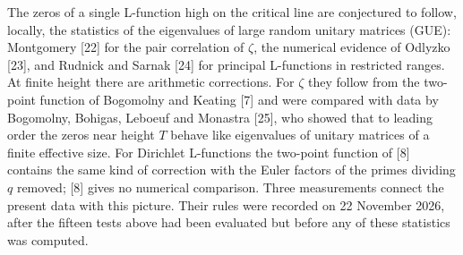\documentclass[
  10pt,
]{article}
\begin{document}
The zeros of a single L-function high on the critical line are
conjectured to follow, locally, the statistics of the eigenvalues of
large random unitary matrices (GUE): Montgomery {[}22{]} for the pair
correlation of \(\zeta\), the numerical evidence of Odlyzko {[}23{]},
and Rudnick and Sarnak {[}24{]} for principal L-functions in restricted
ranges. At finite height there are arithmetic corrections. For \(\zeta\)
they follow from the two-point function of Bogomolny and Keating {[}7{]}
and were compared with data by Bogomolny, Bohigas, Leboeuf and Monastra
{[}25{]}, who showed that to leading order the zeros near height \(T\)
behave like eigenvalues of unitary matrices of a finite effective size.
For Dirichlet L-functions the two-point function of {[}8{]} contains the
same kind of correction with the Euler factors of the primes dividing
\(q\) removed; {[}8{]} gives no numerical comparison. Three measurements
connect the present data with this picture. Their rules were recorded on
22 November 2026, after the fifteen tests above had been evaluated but
before any of these statistics was computed.
\end{document}

